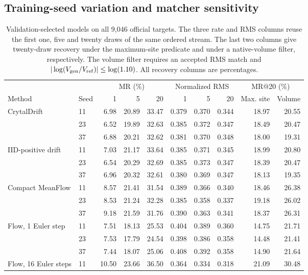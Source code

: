 \subsection{Training-seed variation and matcher sensitivity}
\begin{table}[!htbp]\centering\small
\caption{Validation-selected models on all 9,046 official targets. The three rate and RMS columns reuse the first one, five and twenty draws of the same ordered stream. The last two columns give twenty-draw recovery under the maximum-site predicate and under a native-volume filter, respectively. The volume filter requires an accepted RMS match and $|\log(V_{\rm gen}/V_{\rm ref})|\leq\log(1.10)$. All recovery columns are percentages.}\label{t:exp-perseed}
\begin{tabular}{llrrrrrrrr}\hline &&\multicolumn{3}{c}{MR (\%)}&\multicolumn{3}{c}{Normalized RMS} &\multicolumn{2}{c}{MR@20 (\%)}\\
Method & Seed & 1 & 5 & 20 & 1 & 5 & 20 & Max. site & Volume\\\hline
CrytalDrift & 11 & 6.98 & 20.89 & 33.47 & 0.379 & 0.370 & 0.344 & 18.97 & 20.55 \\
 & 23 & 6.52 & 19.89 & 32.63 & 0.385 & 0.372 & 0.347 & 18.49 & 20.47 \\
 & 37 & 6.88 & 20.21 & 32.62 & 0.381 & 0.370 & 0.348 & 18.00 & 19.31 \\
IID-positive drift & 11 & 7.03 & 21.17 & 33.64 & 0.385 & 0.371 & 0.345 & 18.99 & 20.80 \\
 & 23 & 6.54 & 20.29 & 32.69 & 0.385 & 0.373 & 0.347 & 18.39 & 20.47 \\
 & 37 & 6.96 & 20.32 & 32.61 & 0.380 & 0.369 & 0.347 & 18.13 & 19.35 \\
Compact MeanFlow & 11 & 8.57 & 21.41 & 31.54 & 0.389 & 0.366 & 0.340 & 18.46 & 26.38 \\
 & 23 & 8.53 & 21.24 & 32.28 & 0.385 & 0.358 & 0.337 & 19.18 & 26.02 \\
 & 37 & 9.18 & 21.59 & 31.76 & 0.390 & 0.363 & 0.341 & 18.37 & 26.31 \\
Flow, 1 Euler step & 11 & 7.51 & 18.13 & 25.53 & 0.404 & 0.389 & 0.360 & 14.75 & 21.71 \\
 & 23 & 7.53 & 17.79 & 24.54 & 0.398 & 0.386 & 0.358 & 14.48 & 21.41 \\
 & 37 & 7.44 & 18.07 & 25.06 & 0.408 & 0.392 & 0.358 & 14.90 & 21.64 \\
Flow, 16 Euler steps & 11 & 10.50 & 23.66 & 36.50 & 0.364 & 0.334 & 0.318 & 21.09 & 30.48 \\

\end{tabular}
\end{table}
